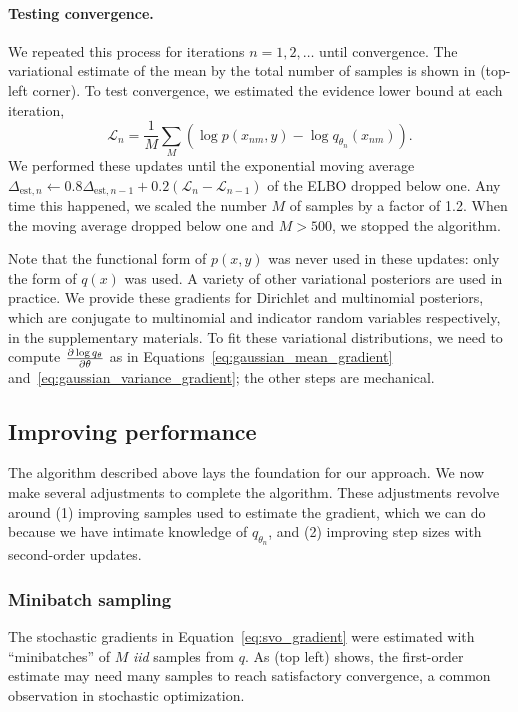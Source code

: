 \paragraph{Testing convergence.}
We repeated this process for iterations $n = 1, 2, \ldots$ until
convergence.  The variational estimate of the mean by the total number of
samples is shown in 
(top-left corner).  To test convergence, we estimated the evidence
lower bound at each iteration,
\[
  \mathcal{L}_n = \frac{1}{M} \sum_M \left( \log p(x_{nm}, y) - \log
q_{\theta_n}(x_{nm}) \right).
\]
We performed these updates until the exponential moving average
$\Delta_{\mbox{est},n} \gets 0.8 \Delta_{\mbox{est},{n-1}} + 0.2
(\mathcal{L}_n - \mathcal{L}_{n-1})$ of the ELBO dropped below one.
Any time this happened, we scaled the number $M$ of samples by a
factor of 1.2. When the moving average dropped below one and $M >
500$, we stopped the algorithm.

Note that the functional form of $p(x, y)$ was never used in these
updates: only the form of $q(x)$ was used.  A variety of other
variational posteriors are used in practice.  We provide these
gradients for Dirichlet and multinomial posteriors, which are
conjugate to multinomial and indicator random variables respectively,
in the supplementary materials. To fit these variational
distributions, we need to compute $\frac{\partial \log q_\theta}{\partial \theta}$ as
in Equations~\ref{eq:gaussian_mean_gradient}
and~\ref{eq:gaussian_variance_gradient}; the other steps are
mechanical.

\subsection*{Improving performance}

The algorithm described above lays the foundation for our approach.  We
now make several adjustments to complete the algorithm.  These
adjustments revolve around (1) improving samples used to estimate the
gradient, which we can do because we have intimate knowledge of
$q_{\theta_n}$, and (2) improving step sizes with second-order updates.

\subsubsection{Minibatch sampling}
\label{sec:minibatch_sampling}
The stochastic gradients in Equation~\ref{eq:svo_gradient} were
estimated with ``minibatches'' of $M$ \emph{iid} samples from $q$.  As
 (top left) shows, the
first-order estimate may need many samples to reach satisfactory
convergence, a common observation in stochastic optimization.

